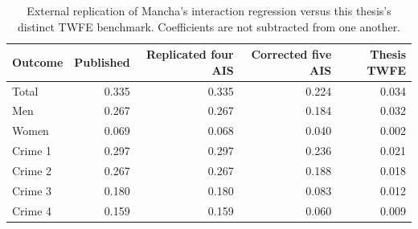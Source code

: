 \begin{table}[htbp]
\centering\small
\caption{External replication of Mancha's interaction regression versus this thesis's distinct TWFE benchmark. Coefficients are not subtracted from one another.}
\label{tab:mancharebuild}
\begin{tabular}{lrrrr}
\toprule
Outcome & Published & Replicated four AIS & Corrected five AIS & Thesis TWFE\\
\midrule
Total & 0.335 & 0.335 & 0.224 & 0.034\\
Men & 0.267 & 0.267 & 0.184 & 0.032\\
Women & 0.069 & 0.068 & 0.040 & 0.002\\
Crime 1 & 0.297 & 0.297 & 0.236 & 0.021\\
Crime 2 & 0.267 & 0.267 & 0.188 & 0.018\\
Crime 3 & 0.180 & 0.180 & 0.083 & 0.012\\
Crime 4 & 0.159 & 0.159 & 0.060 & 0.009\\
\bottomrule
\end{tabular}
\end{table}
